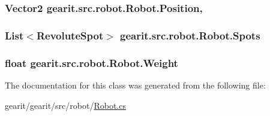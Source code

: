 \hypertarget{classgearit_1_1src_1_1robot_1_1_robot_abc013d298542760926d94c21fd254905}{
\subsubsection[{Position}]{\setlength{\rightskip}{0pt plus 5cm}Vector2 gearit.\+src.\+robot.\+Robot.\+Position\hspace{0.3cm}{\ttfamily [get]}, {\ttfamily [set]}}}\label{classgearit_1_1src_1_1robot_1_1_robot_abc013d298542760926d94c21fd254905}
\hypertarget{classgearit_1_1src_1_1robot_1_1_robot_a47e6e14ba9a13c0ddb474a76dfdef307}{
\subsubsection[{Spots}]{\setlength{\rightskip}{0pt plus 5cm}List$<${\bf Revolute\+Spot}$>$ gearit.\+src.\+robot.\+Robot.\+Spots\hspace{0.3cm}{\ttfamily [get]}}}\label{classgearit_1_1src_1_1robot_1_1_robot_a47e6e14ba9a13c0ddb474a76dfdef307}
\hypertarget{classgearit_1_1src_1_1robot_1_1_robot_a474061eeda5239305f83fa5450499e53}{
\subsubsection[{Weight}]{\setlength{\rightskip}{0pt plus 5cm}float gearit.\+src.\+robot.\+Robot.\+Weight\hspace{0.3cm}{\ttfamily [get]}}}\label{classgearit_1_1src_1_1robot_1_1_robot_a474061eeda5239305f83fa5450499e53}


The documentation for this class was generated from the following file\+:\begin{DoxyCompactItemize}
\item 
gearit/gearit/src/robot/\hyperlink{_robot_8cs}{Robot.\+cs}\end{DoxyCompactItemize}
